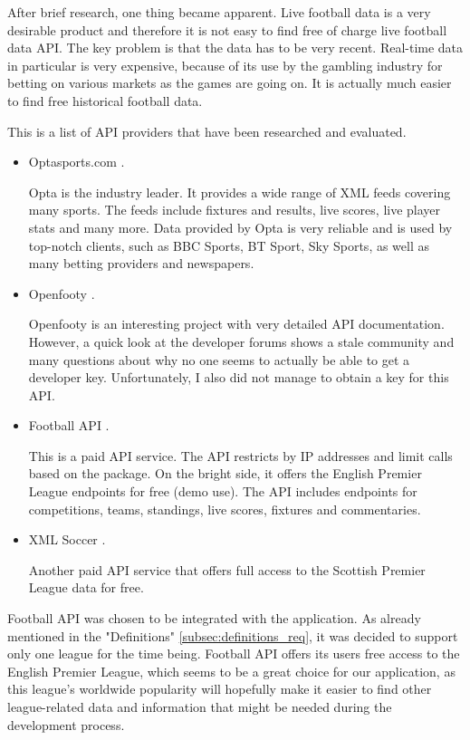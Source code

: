 After brief research, one thing became apparent. Live football data is a very desirable product and therefore it is not easy to find free of charge live football data API. The key problem is that the data has to be very recent. Real-time data in particular is very expensive, because of its use by the gambling industry for betting on various markets as the games are going on. It is actually much easier to find free historical football data. 
	
This is a list of API providers that have been researched and evaluated.
	
\begin{itemize}
	\item Optasports.com \citep{source:opta}.\par
Opta is the industry leader. It provides a wide range of XML feeds covering many sports. The feeds include fixtures and results, live scores, live player stats and many more. Data provided by Opta is very reliable and is used by top-notch clients, such as BBC Sports, BT Sport, Sky Sports, as well as many betting providers and newspapers.		
	\item Openfooty \citep{source:openfooty}.\par
	Openfooty is an interesting project with very detailed API documentation. However, a quick look at the developer forums shows a stale community and many questions about why no one seems to actually be able to get a developer key. Unfortunately, I also did not manage to obtain a key for this API.			
	\item Football API \citep{source:footballapi} .\par
This is a paid API service. The API restricts by IP addresses and limit calls based on the package. On the bright side, it offers the English Premier League endpoints for free (demo use). The API includes endpoints for competitions, teams, standings, live scores, fixtures and commentaries.	
	\item XML Soccer \citep{source:xmlsoccer}. \par
	Another paid API service that offers full access to the Scottish Premier League data for free.
		
\end{itemize}
	
Football API was chosen to be integrated with the application. As already mentioned in the "Definitions" \ref{subsec:definitions_req}, it was decided to support only one league for the time being. Football API offers its users free access to the English Premier League, which seems to be a great choice for our application, as this league's worldwide popularity will hopefully make it easier to find other league-related data and information that might be needed during the development process.

